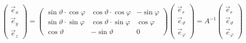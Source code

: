\documentclass[a4paper,10pt]{scrartcl}
\begin{document}
            \begin{equation*}
                \begin{pmatrix}
                    \vec{e}_x \\ \vec{e}_y \\ \vec{e}_z 
                \end{pmatrix} = 
                \begin{pmatrix}
                    \sin \vartheta \cdot \cos \varphi & \cos \vartheta \cdot \cos \varphi & -\sin \varphi \\
                    \sin \vartheta \cdot \sin \varphi & \cos \vartheta \cdot \sin \varphi & \cos \varphi \\
                    \cos \vartheta & -\sin \vartheta & 0
                \end{pmatrix}
                \begin{pmatrix}
                    \vec{e}_r \\ \vec{e}_\vartheta \\ \vec{e}_\varphi 
                \end{pmatrix} = A^{-1}
                \begin{pmatrix}
                    \vec{e}_r \\ \vec{e}_\vartheta \\ \vec{e}_\varphi 
                \end{pmatrix}
            \end{equation*}
\end{document}
